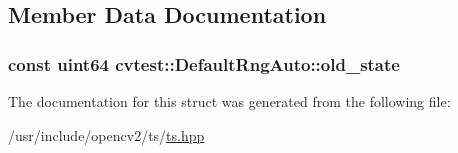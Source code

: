 \subsection{Member Data Documentation}
\hypertarget{structcvtest_1_1DefaultRngAuto_ab85a270aaa3061655e401d43f126be1c}{
\subsubsection[{old\-\_\-state}]{\setlength{\rightskip}{0pt plus 5cm}const {\bf uint64} cvtest\-::\-Default\-Rng\-Auto\-::old\-\_\-state}}\label{structcvtest_1_1DefaultRngAuto_ab85a270aaa3061655e401d43f126be1c}


The documentation for this struct was generated from the following file\-:\begin{DoxyCompactItemize}
\item 
/usr/include/opencv2/ts/\hyperlink{ts_8hpp}{ts.\-hpp}\end{DoxyCompactItemize}
